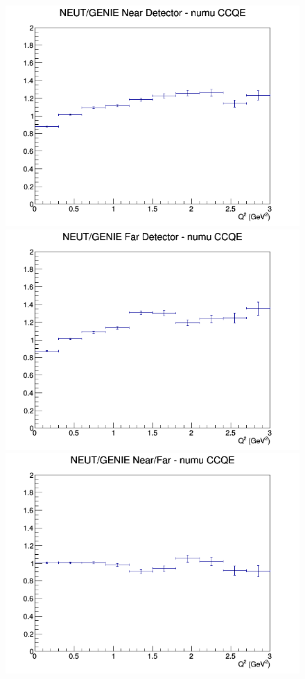 \documentclass[12pt]{article}
\begin{document}
\begin{figure}[h]
\endminipage
\newline
{}
\includegraphics[width=\linewidth]{Q2/nominal/ratios/CCQE_NEUT_GENIE_numu_near_Q2.png}
\endminipage
{}
\includegraphics[width=\linewidth]{Q2/nominal/ratios/CCQE_NEUT_GENIE_numu_far_Q2.png}
\endminipage
{}
\includegraphics[width=\linewidth]{Q2/nominal/ratios/CCQE_NEUT_GENIE_numu_NF_Q2.png}

\end{figure}
\end{document}
